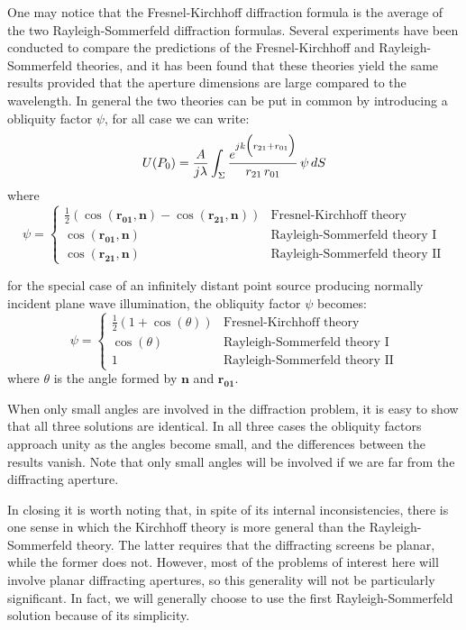 \documentclass{article}
\begin{document}
One may notice that the Fresnel-Kirchhoff diffraction formula is the average of the two Rayleigh-Sommerfeld diffraction formulas.
Several experiments have been conducted to compare the predictions of the Fresnel-Kirchhoff and Rayleigh-Sommerfeld theories, and it has been found that these theories yield the same results provided that the aperture dimensions are large compared to the wavelength. In general the two theories can be put in common by introducing a obliquity factor $\psi$, for all case we can write:
\begin{equation}
U(P_0) = \frac{A}{j\lambda}\int_\Sigma \frac{e^{jk\Bigl(r_{21}+r_{01}\Bigl)}}{r_{21} \, r_{01}} \, \psi \, dS
\end{equation}
where
\begin{equation}
\psi = \begin{cases}
\frac{1}{2} \left(\cos(\mathbf{r_{01}}, \mathbf{n}) - \cos(\mathbf{r_{21}}, \mathbf{n})\right) & \text{Fresnel-Kirchhoff theory} \\
\cos(\mathbf{r_{01}}, \mathbf{n}) & \text{Rayleigh-Sommerfeld theory I} \\
\cos(\mathbf{r_{21}}, \mathbf{n}) & \text{Rayleigh-Sommerfeld theory II}
\end{cases}
\end{equation}

for the special case of an infinitely distant point source producing normally incident plane wave illumination, the obliquity factor $\psi$ becomes:
\begin{equation}
\psi = \begin{cases}
\frac{1}{2} \left(1 + \cos(\theta)\right) & \text{Fresnel-Kirchhoff theory} \\
\cos(\theta) & \text{Rayleigh-Sommerfeld theory I} \\
1 & \text{Rayleigh-Sommerfeld theory II}
\end{cases}
\end{equation}
where $\theta$ is the angle formed by $\mathbf{n}$ and $\mathbf{r_{01}}$.

When only small angles are involved in the diffraction problem, it is easy to
show that all three solutions are identical.
In all three cases the obliquity factors approach unity as the angles become small, and the differences between the results vanish.
Note that only small angles will be involved if we are far from the diffracting aperture.

In closing it is worth noting that, in spite of its internal inconsistencies, there
is one sense in which the Kirchhoff theory is more general than the Rayleigh-Sommerfeld theory.
The latter requires that the diffracting screens be planar, while the former does not.
However, most of the problems of interest here will involve planar diffracting apertures, so this generality will not be particularly significant.
In fact, we will generally choose to use the first Rayleigh-Sommerfeld solution because of its simplicity.
\end{document}
